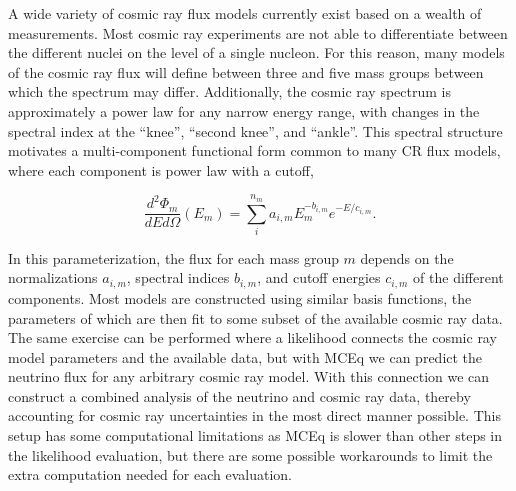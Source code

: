 A wide variety of cosmic ray flux models currently exist based on a wealth of measurements.
Most cosmic ray experiments are not able to differentiate between the different nuclei on the level of a single nucleon.
For this reason, many models of the cosmic ray flux will define between three and five mass groups between which the spectrum may differ.
Additionally, the cosmic ray spectrum is approximately a power law for any narrow energy range, with changes in the spectral index at the ``knee'', ``second knee'', and ``ankle''.
This spectral structure motivates a multi-component functional form common to many CR flux models, where each component is power law with a cutoff,
\begin{linenomath}
\begin{equation}
	\frac{d^2\Phi_m}{dEd\Omega}\left(E_m\right) = \sum_i^{n_m} a_{i,m} E_m^{-b_{i,m}} e^{-E/c_{i,m}}.
\end{equation}
	\label{eq:cr_spectrum}
\end{linenomath}
In this parameterization, the flux for each mass group $m$ depends on the normalizations $a_{i,m}$, spectral indices $b_{i,m}$, and cutoff energies $c_{i,m}$ of the different components.
Most models are constructed using similar basis functions, the parameters of which are then fit to some subset of the available cosmic ray data.
The same exercise can be performed where a likelihood connects the cosmic ray model parameters and the available data, but with MCEq we can predict the neutrino flux for any arbitrary cosmic ray model.
With this connection we can construct a combined analysis of the neutrino and cosmic ray data, thereby accounting for cosmic ray uncertainties in the most direct manner possible.
This setup has some computational limitations as MCEq is slower than other steps in the likelihood evaluation, but there are some possible workarounds to limit the extra computation needed for each evaluation.

